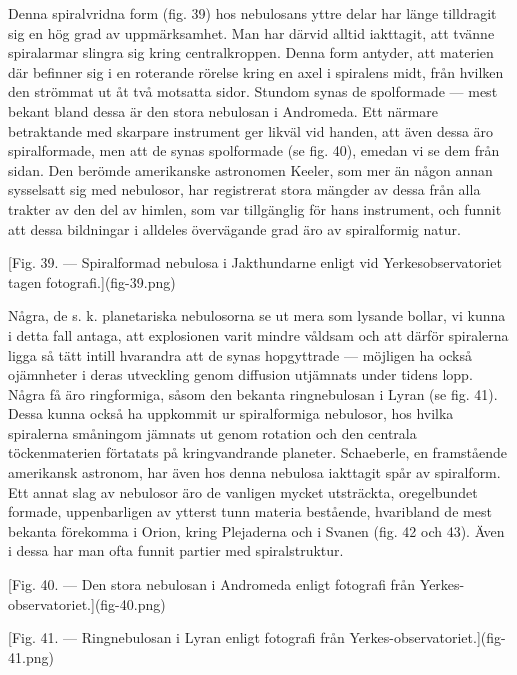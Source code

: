 \documentclass[a4paper, 12pt, oneside, swedish]{article}
\begin{document}
Denna spiralvridna form (fig. 39) hos nebulosans yttre delar har länge tilldragit sig en hög grad av uppmärksamhet. Man har därvid alltid iakttagit, att tvänne spiralarmar slingra sig kring centralkroppen. Denna form antyder, att materien där befinner sig i en roterande rörelse kring en axel i spiralens midt, från hvilken den strömmat ut åt två motsatta sidor. Stundom synas de spolformade --- mest bekant bland dessa är den stora nebulosan i Andromeda. Ett närmare betraktande med skarpare instrument ger likväl vid handen, att även dessa äro spiralformade, men att de synas spolformade (se fig. 40), emedan vi se dem från sidan. Den berömde amerikanske astronomen Keeler, som mer än någon annan sysselsatt sig med nebulosor, har registrerat stora mängder av dessa från alla trakter av den del av himlen, som var tillgänglig för hans instrument, och funnit att dessa bildningar i alldeles övervägande grad äro av spiralformig natur.

[Fig. 39. --- Spiralformad nebulosa i Jakthundarne enligt vid Yerkesobservatoriet tagen fotografi.](fig-39.png)

Några, de s. k. planetariska nebulosorna se ut mera som lysande bollar, vi kunna i detta fall antaga, att explosionen varit mindre våldsam och att därför spiralerna ligga så tätt intill hvarandra att de synas hopgyttrade --- möjligen ha också ojämnheter i deras utveckling genom diffusion utjämnats under tidens lopp. Några få äro ringformiga, såsom den bekanta ringnebulosan i Lyran (se fig. 41). Dessa kunna också ha uppkommit ur spiralformiga nebulosor, hos hvilka spiralerna småningom jämnats ut genom rotation och den centrala töckenmaterien förtatats på kringvandrande planeter. Schaeberle, en framstående amerikansk astronom, har även hos denna nebulosa iakttagit spår av spiralform. Ett annat slag av nebulosor äro de vanligen mycket utsträckta, oregelbundet formade, uppenbarligen av ytterst tunn materia bestående, hvaribland de mest bekanta förekomma i Orion, kring Plejaderna och i Svanen (fig. 42 och 43). Även i dessa har man ofta funnit partier med spiralstruktur.

[Fig. 40. --- Den stora nebulosan i Andromeda enligt fotografi från Yerkes-observatoriet.](fig-40.png)

[Fig. 41. --- Ringnebulosan i Lyran enligt fotografi från Yerkes-observatoriet.](fig-41.png)
\end{document}
